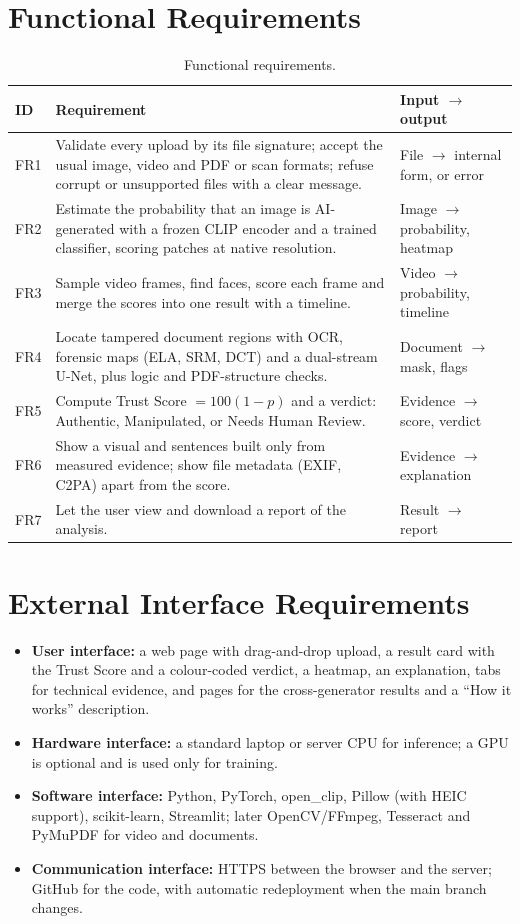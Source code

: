\section{Functional Requirements}
\begin{table}[htbp]
\centering\small
\caption{Functional requirements.}
\begin{tabularx}{\linewidth}{@{}l X p{3.2cm}@{}}
\toprule
ID & Requirement & Input $\rightarrow$ output\\
\midrule
FR1 & Validate every upload by its file signature; accept the usual image, video and PDF or scan formats; refuse corrupt or unsupported files with a clear message. & File $\rightarrow$ internal form, or error\\
FR2 & Estimate the probability that an image is AI-generated with a frozen CLIP encoder and a trained classifier, scoring patches at native resolution. & Image $\rightarrow$ probability, heatmap\\
FR3 & Sample video frames, find faces, score each frame and merge the scores into one result with a timeline. & Video $\rightarrow$ probability, timeline\\
FR4 & Locate tampered document regions with OCR, forensic maps (ELA, SRM, DCT) and a dual-stream U-Net, plus logic and PDF-structure checks. & Document $\rightarrow$ mask, flags\\
FR5 & Compute Trust Score $=100(1-p)$ and a verdict: Authentic, Manipulated, or Needs Human Review. & Evidence $\rightarrow$ score, verdict\\
FR6 & Show a visual and sentences built only from measured evidence; show file metadata (EXIF, C2PA) apart from the score. & Evidence $\rightarrow$ explanation\\
FR7 & Let the user view and download a report of the analysis. & Result $\rightarrow$ report\\
\bottomrule
\end{tabularx}
\end{table}

\section{External Interface Requirements}
\begin{itemize}
  \item \textbf{User interface:} a web page with drag-and-drop upload, a result card with the Trust Score and a colour-coded verdict, a heatmap, an explanation, tabs for technical evidence, and pages for the cross-generator results and a ``How it works'' description.
  \item \textbf{Hardware interface:} a standard laptop or server CPU for inference; a GPU is optional and is used only for training.
  \item \textbf{Software interface:} Python, PyTorch, open\_clip, Pillow (with HEIC support), scikit-learn, Streamlit; later OpenCV/FFmpeg, Tesseract and PyMuPDF for video and documents.
  \item \textbf{Communication interface:} HTTPS between the browser and the server; GitHub for the code, with automatic redeployment when the main branch changes.
\end{itemize}

